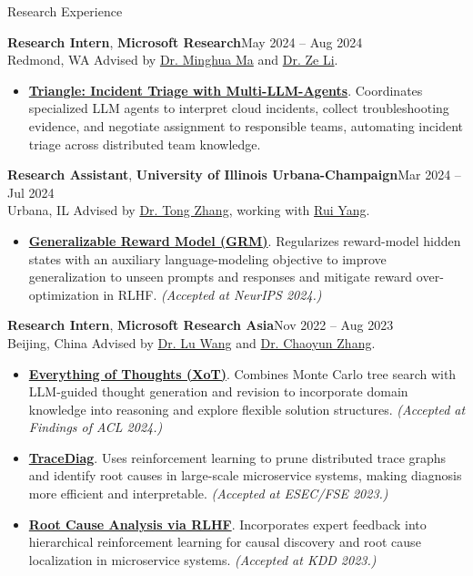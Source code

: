 \documentclass{resume}
\newcommand{\role}[4]{\par\addvspace{6pt}\Needspace{5\baselineskip}\textbf{#1}, \textbf{#2}\hfill #3\\#4\enspace\textbar\enspace}
\begin{document}
\begin{rSection}{Research Experience}
\role{Research Intern}{Microsoft Research}{May 2024 -- Aug 2024}{Redmond, WA}
Advised by \href{https://www.microsoft.com/en-us/research/people/minghuama/}{Dr. Minghua Ma} and \href{https://scholar.google.com/citations?user=hhGVDJwAAAAJ&hl=en}{Dr. Ze Li}.
\begin{itemize}[itemsep=1pt]
\item \textbf{\href{https://www.microsoft.com/en-us/research/wp-content/uploads/2025/02/TRIANGLE_FSE25.pdf}{Triangle: Incident Triage with Multi-LLM-Agents}}. Coordinates specialized LLM agents to interpret cloud incidents, collect troubleshooting evidence, and negotiate assignment to responsible teams, automating incident triage across distributed team knowledge.
\end{itemize}

\role{Research Assistant}{University of Illinois Urbana-Champaign}{Mar 2024 -- Jul 2024}{Urbana, IL}
Advised by \href{https://tongzhang-ml.org/}{Dr. Tong Zhang}, working with \href{https://yangrui2015.github.io/}{Rui Yang}.
\begin{itemize}[itemsep=1pt]
\item \textbf{\href{https://arxiv.org/pdf/2406.10216}{Generalizable Reward Model (GRM)}}. Regularizes reward-model hidden states with an auxiliary language-modeling objective to improve generalization to unseen prompts and responses and mitigate reward over-optimization in RLHF. \textit{(Accepted at NeurIPS 2024.)}
\end{itemize}

\role{Research Intern}{Microsoft Research Asia}{Nov 2022 -- Aug 2023}{Beijing, China}
Advised by \href{https://scholar.google.com/citations?user=hqlU92YAAAAJ&hl=en}{Dr. Lu Wang} and \href{https://scholar.google.com/citations?user=5h9KUFIAAAAJ&hl=en}{Dr. Chaoyun Zhang}.
\begin{itemize}[itemsep=1pt]
\item \textbf{\href{https://aclanthology.org/2024.findings-acl.95.pdf}{Everything of Thoughts (XoT)}}. Combines Monte Carlo tree search with LLM-guided thought generation and revision to incorporate domain knowledge into reasoning and explore flexible solution structures. \textit{(Accepted at Findings of ACL 2024.)}
\item \textbf{\href{https://arxiv.org/pdf/2310.18740}{TraceDiag}}. Uses reinforcement learning to prune distributed trace graphs and identify root causes in large-scale microservice systems, making diagnosis more efficient and interpretable. \textit{(Accepted at ESEC/FSE 2023.)}
\item \textbf{\href{https://dl.acm.org/doi/10.1145/3580305.3599934}{Root Cause Analysis via RLHF}}. Incorporates expert feedback into hierarchical reinforcement learning for causal discovery and root cause localization in microservice systems. \textit{(Accepted at KDD 2023.)}
\end{itemize}


\end{rSection}
\end{document}
